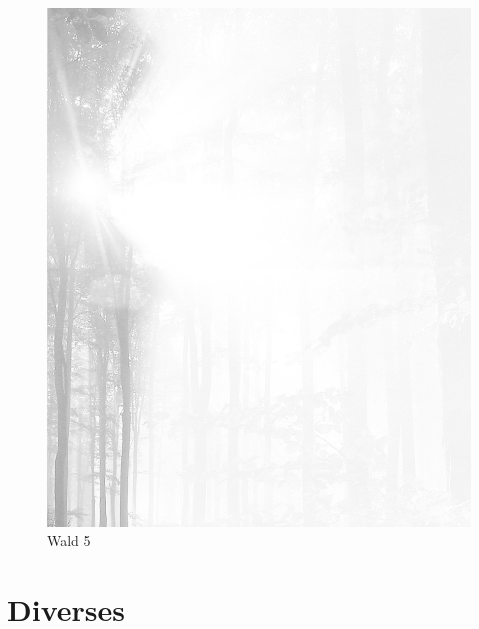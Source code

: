\documentclass[ngerman,a4paper,11pt]{scrreprt}
\begin{document}
\begin{figure}[H]
\centering
\includegraphics[width=\textwidth,height=.8\textheight]{Bilder/Bilder/750_028_59925_sz_todes_ta_.png}
\caption{Wald 5}
\end{figure}

\chapter{Diverses}
\label{sec-3-4}
\end{document}

